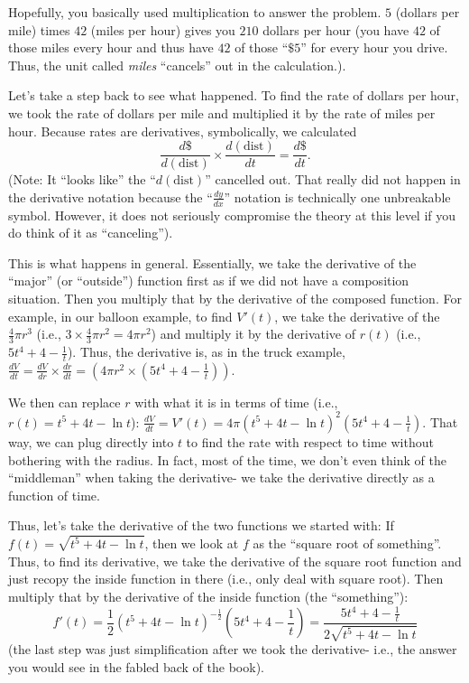 \documentclass{ximera}
\begin{document}
 Hopefully, you basically used multiplication to answer the problem.  $5$ (dollars per mile) times $42$ (miles per hour) gives you $210$ dollars per hour (you have $42$ of those miles every hour and thus have $42$ of those ``$\$5$'' for every hour you drive. Thus, the unit called {\em miles} ``cancels'' out in the calculation.).
 
 
Let's take a step back to see what happened.  To find the rate of dollars per hour, we took the rate of dollars per mile and multiplied it by the rate of miles per hour.  Because rates are derivatives, symbolically, we calculated  \[
\frac{d\$}{d(\text{dist})} \times \frac{d(\text{dist})}{dt} = \frac{d\$}{dt}.
\]
(Note:  It ``looks like'' the ``$d(\text{dist})$'' cancelled out.  That really did not happen in the derivative notation because the ``$\frac{dy}{dx}$'' notation is technically one unbreakable symbol.  However, it does not seriously compromise the theory at this level if you do think of it as ``canceling'').   

 This is what happens in general. Essentially, we take the derivative of the ``major'' (or ``outside'') function first as if we did not have a composition situation.  Then you multiply that by the derivative of the composed function.  For example, in our balloon example, to find  $V'(t)$, we take the derivative of the $\frac{4}{3}\pi r^3$  (i.e.,  $3\times \frac{4}{3}\pi r^2 = 4\pi r^2$) and multiply it by the derivative of $r(t)$ (i.e., $5t^4+4-\frac{1}{t}$).  Thus, the derivative is, as in the truck example,  $\frac{dV}{dt} = \frac{dV}{dr} \times \frac{dr}{dt} = (4\pi r^2 \times \left (5t^4+4-\frac{1}{t} \right ) )$.  
 
    We then can replace $r$ with what it is in terms of time (i.e.,  $r(t) = t^5+4t-\ln t$):   $\frac{dV}{dt} = V'(t) = 4\pi(t^5+4t-\ln t)^2 \left ( 5t^4+4-\frac{1}{t} \right )$.  That way, we can plug directly into $t$ to find the rate with respect to time without bothering with the radius.  In fact, most of the time, we don't even think of the ``middleman'' when taking the derivative- we take the derivative directly as a function of time.
    
     Thus, let's take the derivative of the two functions we started with:
If  $f(t) = \sqrt{t^5+4t-\ln t}$, then we look at $f$ as the ``square root of something''.  Thus, to find its derivative, we take the derivative of the square root function and just recopy the inside function in there (i.e., only deal with square root).  Then multiply that by the derivative of the inside function (the ``something''):
\[
f'(t) = \frac{1}{2}(t^5+4t-\ln t)^{-\frac{1}{2}}\left (5t^4+4-\frac{1}{t} \right) = \frac{5t^4 + 4 - \frac{1}{t}}{2\sqrt{t^5+4t-\ln t}}
\]
(the last step was just simplification after we took the derivative- i.e., the answer you would see in the fabled back of the book).
\end{document}
